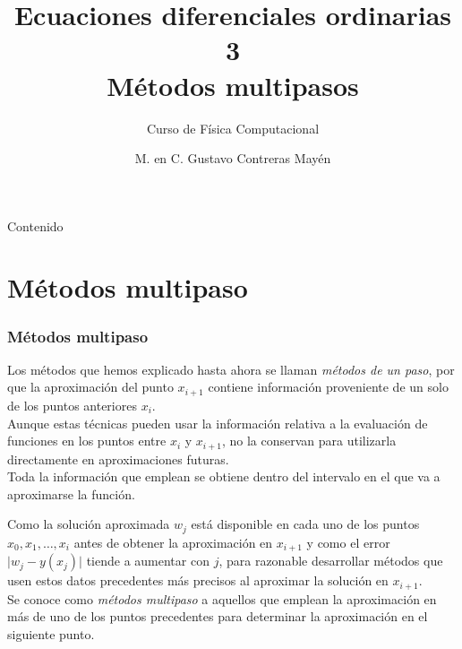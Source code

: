 

\title{Ecuaciones diferenciales ordinarias 3\\ Métodos multipasos}
\subtitle{Curso de Física Computacional}
\author[]{M. en C. Gustavo Contreras Mayén}

\maketitle
\fontsize{14}{14}\selectfont
{}
\begin{frame}{Contenido}
\tableofcontents[pausesections]
\end{frame}
\section{Métodos multipaso}
\begin{frame}
\frametitle{Métodos multipaso}
Los métodos que hemos explicado hasta ahora se llaman \emph{métodos de un paso}, por que la aproximación del punto $x_{i+1}$ contiene información proveniente de un solo de los puntos anteriores $x_{i}$.
\\
\medskip
Aunque estas técnicas pueden usar la información relativa a la evaluación de funciones en los puntos entre $x_{i}$ y $x_{i+1}$, no la conservan para utilizarla directamente en aproximaciones futuras.
\\
\medskip
Toda la información que emplean se obtiene dentro del intervalo en el que va a aproximarse la función.
\end{frame}
\begin{frame}
Como la solución aproximada $w_{j}$ está disponible en cada uno de los puntos $x_{0}, x_{1},\ldots,x_{i}$ antes de obtener la aproximación en $x_{i+1}$ y como el error $\vert w_{j} - y(x_{j}) \vert$ tiende a aumentar con $j$, para razonable desarrollar métodos que usen estos datos precedentes más precisos al aproximar la solución en $x_{i+1}$.
\\
\medskip
Se conoce como \emph{métodos multipaso} a aquellos que emplean la aproximación en más de uno de los puntos precedentes para determinar la aproximación en el siguiente punto.
\end{frame}
